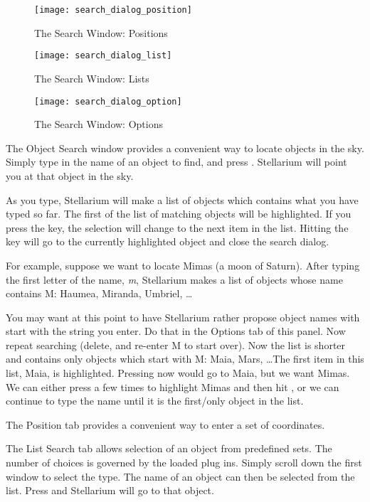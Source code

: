 \begin{figure}[p]
\centering\texttt{[image: search\_dialog\_position]}
\caption{The Search Window: Positions}
\label{fig:gui:search:position}
\end{figure}

\begin{figure}[p]
\centering\texttt{[image: search\_dialog\_list]}
\caption{The Search Window: Lists}
\label{fig:gui:search:lists}
\end{figure}


\begin{figure}[tp]
\centering\texttt{[image: search\_dialog\_option]}
\caption{The Search Window: Options}
\label{fig:gui:search:options}
\end{figure}

The Object Search window provides a convenient way to locate objects
in the sky. Simply type in the name of an object to find, and press
\key{\return}. Stellarium will point you at that object in the sky.

As you type, Stellarium will make a list of objects which contains 
what you have typed so far. The first of the list of matching objects
will be highlighted. If you press the \key{\tab} key, the selection will change
to the next item in the list. Hitting the \key{\return} key will go to the
currently highlighted object and close the search dialog.

For example, suppose we want to locate Mimas (a moon of Saturn). After
typing the first letter of the name, \emph{m}, Stellarium makes a list
of objects whose name contains M: Haumea, Miranda, Umbriel, \ldots 

You may want at this point to have Stellarium rather propose object
names with start with the string you enter. Do that in the Options tab
of this panel. Now repeat searching (delete, and re-enter M to start
over). Now the list is shorter and contains only objects which start
with M: Maia, Mars, \ldots The first item in this list, Maia, is
highlighted. Pressing \key{\return} now would go to Maia, but we want
Mimas. We can either press \key{\tab} a few times to highlight Mimas
and then hit \key{\return}, or we can continue to type the name until
it is the first/only object in the list.


The Position tab provides a convenient way to enter a set
of coordinates.


The List Search tab allows selection of an object from predefined
sets.  The number of choices is governed by the loaded plug
ins. Simply scroll down the first window to select the type. The name
of an object can then be selected from the list. Press \key{\return} and
Stellarium will go to that object.


